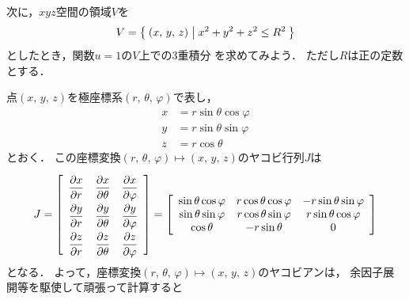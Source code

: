 次に，$xyz$空間の領域$V$を
\begin{align*}
V = \Set{ (x, \, y, \, z ) | x^2 + y^2 + z^2 \leq R^2 }
\end{align*}
としたとき，関数$u=1$の$V$上での3重積分
を求めてみよう．
ただし$R$は正の定数とする．

点$(x, \, y, \, z)$を極座標系$(r, \, \theta, \, \varphi)$で表し，
\begin{align*}
x & = r \sin \theta \cos \varphi \\
y & = r \sin \theta \sin \varphi \\
z & = r \cos \theta 
\end{align*}
とおく．
この座標変換$(r, \, \theta , \, \varphi ) \mapsto (x, \, y, \, z)$のヤコビ行列$J$は
\begin{align*}
J = \left[ 
\renewcommand{\arraystretch}{2}
\begin{array}{ccc} 
\dfrac{ \partial x}{\partial r} & \dfrac{ \partial x}{\partial \theta} 
& \dfrac{ \partial x}{\partial \varphi} \\
\dfrac{ \partial y}{\partial r} & \dfrac{ \partial y}{\partial \theta} 
& \dfrac{ \partial y}{\partial \varphi} \\
\dfrac{ \partial z}{\partial r} & \dfrac{ \partial z}{\partial \theta} 
& \dfrac{ \partial z}{\partial \varphi} 
\end{array}
\renewcommand{\arraystretch}{1}
\right] = \left[
\begin{array}{ccc}
\sin \theta \cos \varphi & r \cos \theta \cos \varphi & - r \sin \theta \sin \varphi \\
\sin \theta \sin \varphi & r \cos \theta \sin \varphi & r \sin \theta \cos \varphi \\
\cos \theta & -r \sin \theta & 0
\end{array}
\right]
\end{align*}
となる．
よって，座標変換$(r, \, \theta , \, \varphi ) \mapsto (x, \, y, \, z)$のヤコビアンは，
余因子展開等を駆使して頑張って計算すると

